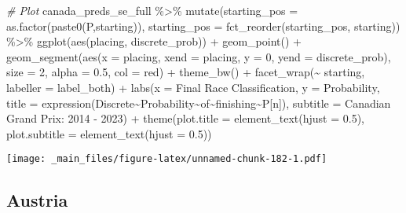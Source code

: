 \documentclass[
]{book}
\newenvironment{Shaded}{\begin{snugshade}}{\end{snugshade}}
\newcommand{\AttributeTok}[1]{\textcolor[rgb]{0.77,0.63,0.00}{#1}}
\newcommand{\CommentTok}[1]{\textcolor[rgb]{0.56,0.35,0.01}{\textit{#1}}}
\newcommand{\DecValTok}[1]{\textcolor[rgb]{0.00,0.00,0.81}{#1}}
\newcommand{\FloatTok}[1]{\textcolor[rgb]{0.00,0.00,0.81}{#1}}
\newcommand{\FunctionTok}[1]{\textcolor[rgb]{0.00,0.00,0.00}{#1}}
\newcommand{\NormalTok}[1]{#1}
\newcommand{\SpecialCharTok}[1]{\textcolor[rgb]{0.00,0.00,0.00}{#1}}
\newcommand{\StringTok}[1]{\textcolor[rgb]{0.31,0.60,0.02}{#1}}
\begin{document}
\begin{Shaded}
\begin{Highlighting}[]
\CommentTok{\# Plot}
\NormalTok{canada\_preds\_se\_full }\SpecialCharTok{\%\textgreater{}\%}
  \FunctionTok{mutate}\NormalTok{(}\AttributeTok{starting\_pos =} \FunctionTok{as.factor}\NormalTok{(}\FunctionTok{paste0}\NormalTok{(}\StringTok{\textquotesingle{}P\textquotesingle{}}\NormalTok{,starting)),}
         \AttributeTok{starting\_pos =} \FunctionTok{fct\_reorder}\NormalTok{(starting\_pos, starting)) }\SpecialCharTok{\%\textgreater{}\%}
  \FunctionTok{ggplot}\NormalTok{(}\FunctionTok{aes}\NormalTok{(placing, discrete\_prob)) }\SpecialCharTok{+}
  \FunctionTok{geom\_point}\NormalTok{() }\SpecialCharTok{+}
  \FunctionTok{geom\_segment}\NormalTok{(}\FunctionTok{aes}\NormalTok{(}\AttributeTok{x =}\NormalTok{ placing, }\AttributeTok{xend =}\NormalTok{ placing, }\AttributeTok{y =} \DecValTok{0}\NormalTok{, }\AttributeTok{yend =}\NormalTok{ discrete\_prob),}
               \AttributeTok{size =} \DecValTok{2}\NormalTok{, }\AttributeTok{alpha =} \FloatTok{0.5}\NormalTok{, }\AttributeTok{col =} \StringTok{\textquotesingle{}red\textquotesingle{}}\NormalTok{) }\SpecialCharTok{+}
  \FunctionTok{theme\_bw}\NormalTok{() }\SpecialCharTok{+}
  \FunctionTok{facet\_wrap}\NormalTok{(}\SpecialCharTok{\textasciitilde{}}\NormalTok{ starting, }\AttributeTok{labeller =}\NormalTok{ label\_both) }\SpecialCharTok{+}
  \FunctionTok{labs}\NormalTok{(}\AttributeTok{x =} \StringTok{\textquotesingle{}Final Race Classification\textquotesingle{}}\NormalTok{,}
       \AttributeTok{y =} \StringTok{\textquotesingle{}Probability\textquotesingle{}}\NormalTok{,}
       \AttributeTok{title =} \FunctionTok{expression}\NormalTok{(Discrete}\SpecialCharTok{\textasciitilde{}}\NormalTok{Probability}\SpecialCharTok{\textasciitilde{}}\NormalTok{of}\SpecialCharTok{\textasciitilde{}}\NormalTok{finishing}\SpecialCharTok{\textasciitilde{}}\NormalTok{P[n]),}
       \AttributeTok{subtitle =} \StringTok{\textquotesingle{}Canadian Grand Prix: 2014 {-} 2023\textquotesingle{}}\NormalTok{) }\SpecialCharTok{+}
  \FunctionTok{theme}\NormalTok{(}\AttributeTok{plot.title =} \FunctionTok{element\_text}\NormalTok{(}\AttributeTok{hjust =} \FloatTok{0.5}\NormalTok{),}
        \AttributeTok{plot.subtitle =} \FunctionTok{element\_text}\NormalTok{(}\AttributeTok{hjust =} \FloatTok{0.5}\NormalTok{)) }
\end{Highlighting}
\end{Shaded}

\texttt{[image: \_main\_files/figure-latex/unnamed-chunk-182-1.pdf]}

\hypertarget{austria}{%
\subsection{Austria}\label{austria}}
\end{document}
